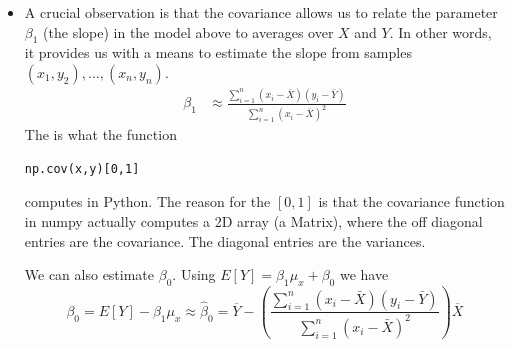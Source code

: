 \begin{itemize}
\item A crucial observation is that the covariance allows us to relate the parameter $\beta_1$ (the slope) in the model above to averages over $X$ and $Y$. In other words, it provides us with a means to estimate the slope from samples $(x_1,y_2),\dots,(x_n,y_n)$. 
\begin{align*}
 \beta_1 &\approx  \frac{\sum_{i=1}^n\left(x_i - \bar{X}\right)\left(y_i-\bar{Y}\right)}{\sum_{i=1}^n\left(x_i - \bar{X}\right)^2}
\end{align*}
The is what the function 
\begin{Verbatim}
np.cov(x,y)[0,1]
\end{Verbatim}
computes in Python. 
The reason for the $[0,1]$ is that the covariance function in numpy actually computes a 2D array (a Matrix), where the off diagonal entries are the covariance. The diagonal entries are the variances. 

We can also estimate $\beta_0$. Using $E[Y] = \beta_1 \mu_x + \beta_0$ we have
\begin{equation*}
\beta_0 =  E[Y]  - \beta_1 \mu_x \approx \hat{\beta}_0 =  \overline{Y} - \left(\frac{\sum_{i=1}^n\left(x_i - \bar{X}\right)\left(y_i-\bar{Y}\right)}{\sum_{i=1}^n\left(x_i - \bar{X}\right)^2}\right)\overline{X}
\end{equation*}


\end{itemize}


